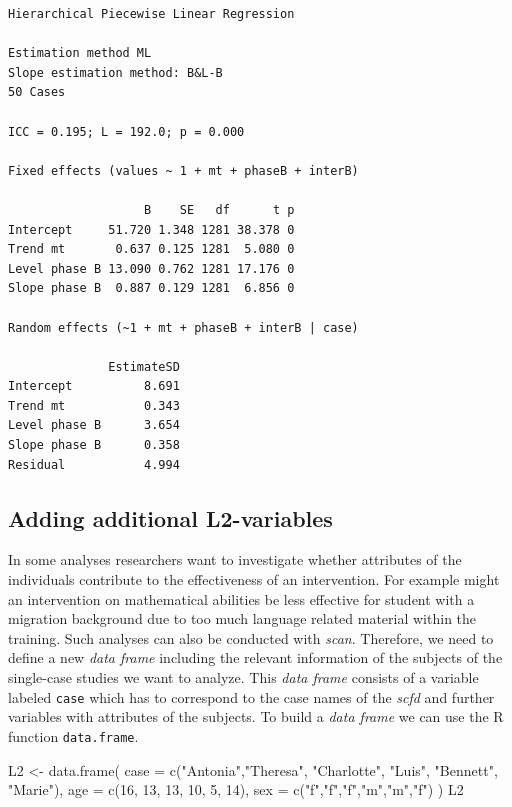 \documentclass[
]{book}
\newenvironment{Shaded}{\begin{snugshade}}{\end{snugshade}}
\newcommand{\AttributeTok}[1]{\textcolor[rgb]{0.77,0.63,0.00}{#1}}
\newcommand{\DecValTok}[1]{\textcolor[rgb]{0.00,0.00,0.81}{#1}}
\newcommand{\FunctionTok}[1]{\textcolor[rgb]{0.00,0.00,0.00}{#1}}
\newcommand{\NormalTok}[1]{#1}
\newcommand{\OtherTok}[1]{\textcolor[rgb]{0.56,0.35,0.01}{#1}}
\newcommand{\StringTok}[1]{\textcolor[rgb]{0.31,0.60,0.02}{#1}}
\begin{document}
\begin{verbatim}
Hierarchical Piecewise Linear Regression

Estimation method ML 
Slope estimation method: B&L-B 
50 Cases

ICC = 0.195; L = 192.0; p = 0.000

Fixed effects (values ~ 1 + mt + phaseB + interB)

                   B    SE   df      t p
Intercept     51.720 1.348 1281 38.378 0
Trend mt       0.637 0.125 1281  5.080 0
Level phase B 13.090 0.762 1281 17.176 0
Slope phase B  0.887 0.129 1281  6.856 0

Random effects (~1 + mt + phaseB + interB | case)

              EstimateSD
Intercept          8.691
Trend mt           0.343
Level phase B      3.654
Slope phase B      0.358
Residual           4.994
\end{verbatim}

\hypertarget{adding-additional-l2-variables}{%
\subsection{Adding additional L2-variables}\label{adding-additional-l2-variables}}

In some analyses researchers want to investigate whether attributes of the individuals contribute to the effectiveness of an intervention. For example might an intervention on mathematical abilities be less effective for student with a migration background due to too much language related material within the training. Such analyses can also be conducted with \emph{scan}. Therefore, we need to define a new \emph{data frame} including the relevant information of the subjects of the single-case studies we want to analyze. This \emph{data frame} consists of a variable labeled \texttt{case} which has to correspond to the case names of the \emph{scfd} and further variables with attributes of the subjects. To build a \emph{data frame} we can use the R function \texttt{data.frame}.

\begin{Shaded}
\begin{Highlighting}[]
\NormalTok{L2 }\OtherTok{\textless{}{-}} \FunctionTok{data.frame}\NormalTok{(}
  \AttributeTok{case =} \FunctionTok{c}\NormalTok{(}\StringTok{"Antonia"}\NormalTok{,}\StringTok{"Theresa"}\NormalTok{, }\StringTok{"Charlotte"}\NormalTok{, }\StringTok{"Luis"}\NormalTok{, }\StringTok{"Bennett"}\NormalTok{, }\StringTok{"Marie"}\NormalTok{), }
  \AttributeTok{age =} \FunctionTok{c}\NormalTok{(}\DecValTok{16}\NormalTok{, }\DecValTok{13}\NormalTok{, }\DecValTok{13}\NormalTok{, }\DecValTok{10}\NormalTok{, }\DecValTok{5}\NormalTok{, }\DecValTok{14}\NormalTok{), }
  \AttributeTok{sex =} \FunctionTok{c}\NormalTok{(}\StringTok{"f"}\NormalTok{,}\StringTok{"f"}\NormalTok{,}\StringTok{"f"}\NormalTok{,}\StringTok{"m"}\NormalTok{,}\StringTok{"m"}\NormalTok{,}\StringTok{"f"}\NormalTok{)}
\NormalTok{)}
\NormalTok{L2}
\end{Highlighting}
\end{Shaded}
\end{document}
